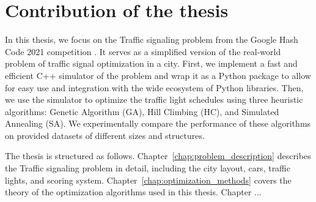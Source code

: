\section*{Contribution of the thesis}

In this thesis, we focus on the Traffic signaling problem from the Google Hash Code 2021 competition \cite{google2023google}. It serves as a simplified version of the real-world problem of traffic signal optimization in a city. First, we implement a fast and efficient C++ simulator of the problem and wrap it as a Python package to allow for easy use and integration with the wide ecosystem of Python libraries. Then, we use the simulator to optimize the traffic light schedules using three heuristic algorithms: Genetic Algorithm (GA), Hill Climbing (HC), and Simulated Annealing (SA). We experimentally compare the performance of these algorithms on provided datasets of different sizes and structures.

The thesis is structured as follows. Chapter~\ref{chap:problem_description} describes the Traffic signaling problem in detail, including the city layout, cars, traffic lights, and scoring system. Chapter~\ref{chap:optimization_methods} covers the theory of the optimization algorithms used in this thesis. Chapter ...


